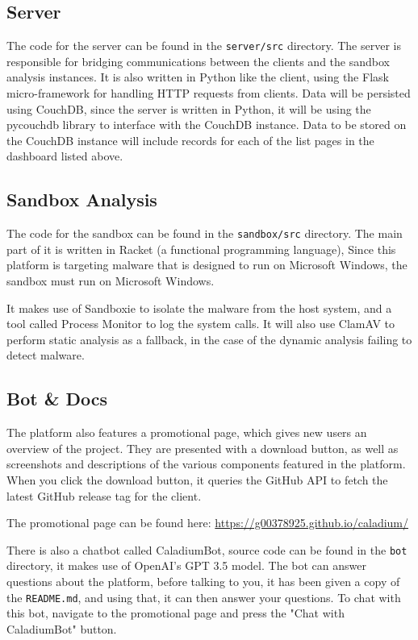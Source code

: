 \subsection{Server}
The code for the server can be found in the \texttt{server/src} directory.
The server is responsible for bridging communications between
the clients and the sandbox analysis instances.
It is also written in Python like the client,
using the Flask micro-framework for handling HTTP requests from clients.
Data will be persisted using CouchDB, since the server is written in Python,
it will be using the pycouchdb library to interface with the CouchDB instance.
Data to be stored on the CouchDB instance will include records for
each of the list pages in the dashboard listed above.

\subsection{Sandbox Analysis}
The code for the sandbox can be found in the \texttt{sandbox/src} directory.
The main part of it is written in Racket (a functional programming language),
Since this platform is targeting malware that is designed to
run on Microsoft Windows, the sandbox must run on Microsoft Windows.

It makes use of Sandboxie to isolate the malware from the host system,
and a tool called Process Monitor to log the system calls.
It will also use ClamAV to perform static analysis as a fallback,
in the case of the dynamic analysis failing to detect malware.

\subsection{Bot \& Docs}
The platform also features a promotional page,
which gives new users an overview of the project.
They are presented with a download button,
as well as screenshots and descriptions of
the various components featured in the platform.
When you click the download button,
it queries the GitHub API to fetch the latest
GitHub release tag for the client.

The promotional page can be found here:
\href{https://g00378925.github.io/caladium/}{https://g00378925.github.io/caladium/}

There is also a chatbot called CaladiumBot, source code can be found in the
\texttt{bot} directory, it makes use of OpenAI's GPT 3.5 model. \cite{openai}
The bot can answer questions about the platform,
before talking to you, it has been given a copy of the \texttt{README.md},
and using that, it can then answer your questions.
To chat with this bot, navigate to the promotional page and press the
"Chat with CaladiumBot" button.

